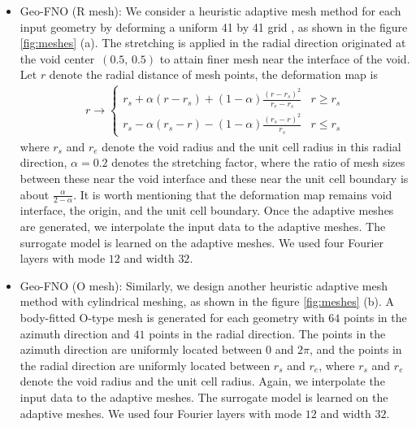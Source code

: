 \documentclass{article}
\begin{document}
\begin{itemize}
\item Geo-FNO (R mesh): We consider a heuristic adaptive mesh method for each input geometry by deforming a uniform 41 by 41 grid , as shown in the figure
\ref{fig:meshes} (a). The stretching is applied in the radial direction originated at the void center~$(0.5,\,0.5)$ to attain finer mesh near the interface of the void. Let $r$ denote the radial distance of mesh points, the deformation map is
 \begin{align*}
     r \rightarrow
     \begin{cases}
     r_s  + \alpha(r - r_s) + (1-\alpha)\frac{(r - r_s)^2}{r_e - r_s} & r \geq r_s\\
     r_s  - \alpha(r_s - r) - (1-\alpha)\frac{(r_s - r)^2}{r_s}   & r \leq r_s
     \end{cases}
 \end{align*}
 where $r_s$ and $r_e$ denote the void radius and the unit cell radius  in this radial direction, $\alpha=0.2$ denotes the stretching factor, where the ratio of mesh sizes between these near the void interface and these near the unit cell boundary is about $\frac{\alpha}{2-\alpha}$. It is worth mentioning that the deformation map remains void interface, the origin, and the unit cell boundary. Once the adaptive meshes are generated, we interpolate the input data to the adaptive meshes. The surrogate model is learned on the adaptive meshes. We used four Fourier layers with mode $12$ and width $32$.
\item Geo-FNO (O mesh): Similarly, we design another heuristic adaptive mesh method with cylindrical meshing, as shown in the figure \ref{fig:meshes} (b). A body-fitted O-type mesh is generated for each geometry with $64$ points in the azimuth direction and $41$ points in the radial direction.  The points in the azimuth direction are uniformly located between $0$ and $2\pi$, and the points in the radial direction are uniformly located between $r_s$ and $r_e$, where $r_s$ and $r_e$ denote the void radius and the unit cell radius. Again, we interpolate the input data to the adaptive meshes. The surrogate model is learned on the adaptive meshes. We used four Fourier layers with mode $12$ and width $32$.
\end{itemize}
\end{document}
